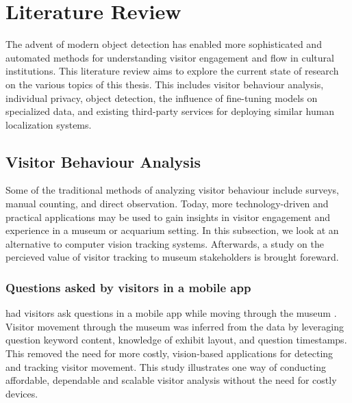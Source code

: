 \section{Literature Review}
\label{sec:literature}
The advent of modern object detection has enabled more sophisticated and automated methods for understanding visitor engagement and flow in cultural institutions. This literature review aims to explore the current state of research on the various topics of this thesis. This includes visitor behaviour analysis, individual privacy, object detection, the influence of fine-tuning models on specialized data, and existing third-party services for deploying similar human localization systems.

\subsection{Visitor Behaviour Analysis}
\label{sec:visitor_behaviuor_analysis}
Some of the traditional methods of analyzing visitor behaviour include surveys, manual counting, and direct observation. Today, more technology-driven and practical applications may be used to gain insights in visitor engagement and experience in a museum or acquarium setting. In this subsection, we look at an alternative to computer vision tracking systems. Afterwards, a study on the percieved value of visitor tracking to museum stakeholders is brought foreward.

\subsubsection{Questions asked by visitors in a mobile app}
\citeauthor{co2023appquestionairre} had visitors ask questions in a mobile app while moving through the museum \citeyear{co2023appquestionairre}. Visitor movement through the museum was inferred from the data by leveraging question keyword content, knowledge of exhibit layout, and question timestamps. This removed the need for more costly, vision-based applications for detecting and tracking visitor movement. This study illustrates one way of conducting affordable, dependable and scalable visitor analysis without the need for costly devices.

